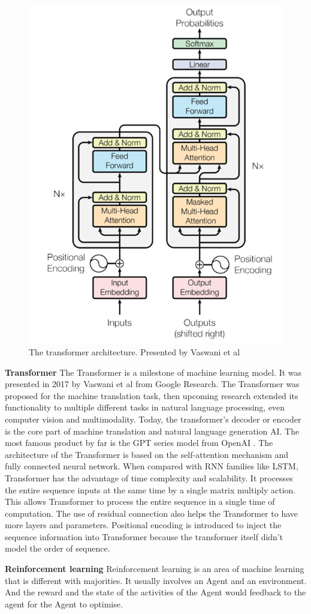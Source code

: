 \begin{figure}[hbt!]
    \centering
    \includegraphics[width=0.5\linewidth]{myReport/figures/transformer.png}
    \caption{The transformer architecture. Presented by Vaswani et al\cite{vaswani2017attention}}
    \label{fig:graph}
\end{figure}

\noindent\textbf{Transformer} \qquad		The Transformer is a milestone of machine learning model. It was presented in 2017 by Vaswani et al \cite{vaswani2017attention} from Google Research. The Transformer was proposed for the machine translation task, then upcoming research extended its functionality to multiple different tasks in natural language processing, even computer vision and multimodality. Today, the transformer's decoder or encoder is the core part of machine translation and natural language generation AI. The most famous product by far is the GPT series model from OpenAI \cite{ouyang2022training}. The architecture of the Transformer is based on the self-attention mechanism and fully connected neural network. When compared with RNN families like LSTM, Transformer has the advantage of time complexity and scalability. It processes the entire sequence inputs at the same time by a single matrix multiply action. This allows Transformer to process the entire sequence in a single time of computation. The use of residual connection \cite{he2016deep} also helps the Transformer to have more layers and parameters. Positional encoding is introduced to inject the sequence information into Transformer because the transformer itself didn’t model the order of sequence. 


\noindent\textbf{Reinforcement learning} \qquad		Reinforcement learning is an area of machine learning that is different with majorities. It usually involves an Agent and an environment. And the reward and the state of the activities of the Agent would feedback to the agent for the Agent to optimise.

